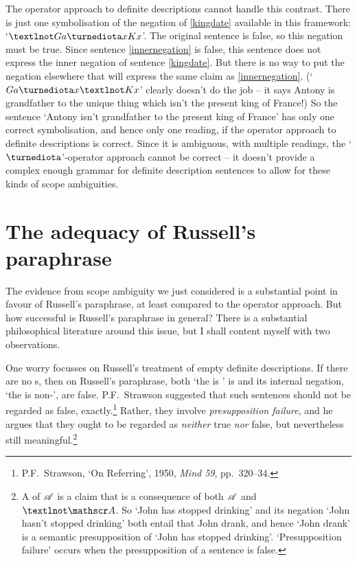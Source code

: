 The operator approach to definite descriptions cannot handle this contrast. There is just one symbolisation of the negation of \ref{kingdate} available in this framework: `$¬Ga\maththe x Kx$'. The original sentence is false, so this negation must be true. Since sentence \ref{innernegation} is false, this sentence does not express the inner negation of sentence \ref{kingdate}. But there is no way to put the negation elsewhere that will express the same claim as \ref{innernegation}. (`$Ga\maththe x ¬Kx$' clearly doesn't do the job – it says Antony is grandfather to the unique thing which isn't the present king of France!) So the sentence `Antony isn't grandfather to the present king of France' has only one correct symbolisation, and hence only one reading, if the operator approach to definite descriptions is correct. Since it is ambiguous, with multiple readings, the `$\maththe$'-operator approach cannot be correct – it doesn't provide a complex enough grammar for definite description sentences to allow for these kinds of scope ambiguities.




\section{The adequacy of Russell's paraphrase}
The evidence from scope ambiguity we just considered is a substantial point in favour of Russell's paraphrase, at least compared to the operator approach. But how successful is Russell's paraphrase in general?  There is a substantial philosophical literature around this issue, but I shall content myself with two observations.

One worry focusses on Russell's treatment of empty definite descriptions. If there are no s, then on Russell's paraphrase, both `the  is ' is and its internal negation, `the  is non-', are false. P.F.\ Strawson suggested that such sentences should not be regarded as false, exactly.\footnote{P.F.\ Strawson, `On Referring', 1950, \emph{Mind 59}, pp.\ 320–34.} Rather, they involve \emph{presupposition failure}, and he argues that they ought to be regarded as \emph{neither} true \emph{nor} false, but nevertheless still meaningful.\footnote{A  of $\mathscr{A}$ is a claim that is a consequence of both $\mathscr{A}$ and $¬\meta{A}$. So `John has stopped drinking' and its negation `John hasn't stopped drinking' both entail that John drank, and hence `John drank' is a semantic presupposition of `John has stopped drinking'. `Presupposition failure' occurs when the presupposition of a sentence is false.}

